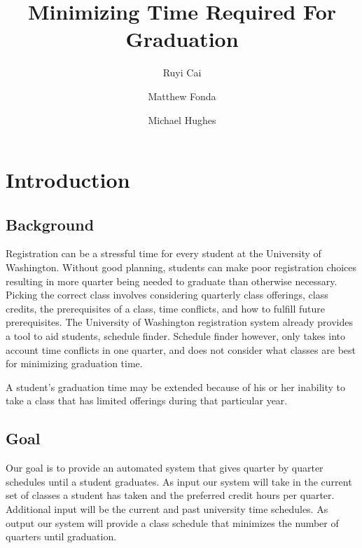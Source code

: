 \documentclass[11pt]{article} %
\title{Minimizing Time Required For Graduation}
\author{Ruyi Cai \and Matthew Fonda \and Michael Hughes}
\begin{document}
\maketitle

\pagebreak


\section{Introduction} \subsection{Background} Registration can be a stressful
time for every student at the University of Washington. Without good
planning, students can make poor registration choices resulting in more quarter
being needed to graduate than otherwise necessary. Picking the correct class
involves considering quarterly class offerings, class credits, the prerequisites
of a class, time conflicts, and how to fulfill future prerequisites. The
University of Washington registration system already provides a tool to aid
students, schedule finder. Schedule finder however, only takes into account time
conflicts in one quarter, and does not consider what classes are best for
minimizing graduation time.

A student's graduation time may be extended because of his or her inability to
take a class that has limited offerings during that particular year.

\subsection{Goal} Our goal is to provide an automated system that gives quarter
by quarter schedules until a student graduates. As input our system will take in
the current set of classes a student has taken and the preferred credit hours
per quarter. Additional input will be the current and past university time
schedules. As output our system will provide a class schedule that minimizes the
number of quarters until graduation.
\end{document}
